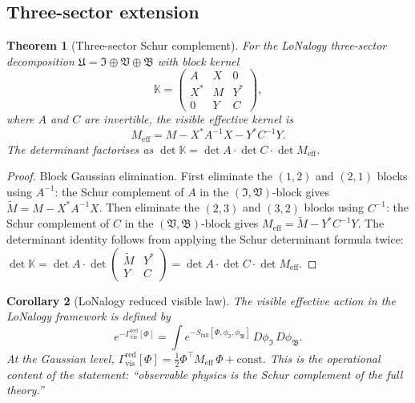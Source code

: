 \documentclass[12pt]{article}
\theoremstyle{plain}
\newtheorem{theorem}{Theorem}[section]
\newtheorem{corollary}[theorem]{Corollary}
\theoremstyle{definition}
\numberwithin{equation}{section}
\newcommand{\vis}{\mathrm{vis}}
\newcommand{\eff}{\mathrm{eff}}
\newcommand{\red}{\mathrm{red}}
\newcommand{\fU}{\mathfrak{U}}
\newcommand{\fI}{\mathfrak{I}}
\newcommand{\fV}{\mathfrak{V}}
\newcommand{\fB}{\mathfrak{B}}
\begin{document}
\subsection{Three-sector extension}

\begin{theorem}[Three-sector Schur complement]\label{thm:threesector}
For the LoNalogy three-sector decomposition
$\fU=\fI\oplus\fV\oplus\fB$ with block kernel
\begin{equation}
\mathbb{K} = \begin{pmatrix}
A & X & 0\\
X^* & M & Y^*\\
0 & Y & C
\end{pmatrix},
\end{equation}
where $A$ and $C$ are invertible, the visible effective kernel is
\begin{equation}
\boxed{M_{\eff} = M - X^*A^{-1}X - Y^*C^{-1}Y.}
\end{equation}
The determinant factorises as
$\det\mathbb{K}=\det A\cdot\det C\cdot\det M_{\eff}$.
\end{theorem}

\begin{proof}
Block Gaussian elimination.  First eliminate the $(1,2)$ and $(2,1)$
blocks using $A^{-1}$: the Schur complement of $A$ in the
$(\fI,\fV)$-block gives $\widetilde{M}=M-X^*A^{-1}X$.  Then eliminate
the $(2,3)$ and $(3,2)$ blocks using $C^{-1}$: the Schur complement of
$C$ in the $(\fV,\fB)$-block gives $M_{\eff}=\widetilde{M}-Y^*C^{-1}Y$.
The determinant identity follows from applying the Schur determinant
formula twice:
$\det\mathbb{K}=\det A\cdot\det\begin{pmatrix}\widetilde{M}&Y^*\\Y&C\end{pmatrix}
=\det A\cdot\det C\cdot\det M_{\eff}$.
\end{proof}

\begin{corollary}[LoNalogy reduced visible law]\label{cor:reducedlaw}
The visible effective action in the LoNalogy framework is defined by
\begin{equation}
e^{-\Gamma_{\vis}^{\red}[\Phi]}
= \int e^{-S_{\mathrm{full}}[\Phi,\phi_{\fI},\phi_{\fB}]}
\,D\phi_{\fI}\,D\phi_{\fB}.
\end{equation}
At the Gaussian level, $\Gamma_{\vis}^{\red}[\Phi]
=\frac{1}{2}\Phi^\top M_{\eff}\,\Phi+\mathrm{const}$.
This is the operational content of the statement: ``observable physics
is the Schur complement of the full theory.''
\end{corollary}
\end{document}
